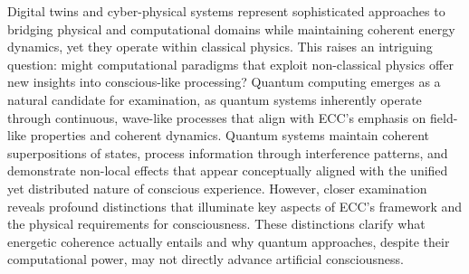 Digital twins and cyber-physical systems represent sophisticated approaches to bridging physical and computational domains while maintaining coherent energy dynamics, yet they operate within classical physics. This raises an intriguing question: might computational paradigms that exploit non-classical physics offer new insights into conscious-like processing? Quantum computing emerges as a natural candidate for examination, as quantum systems inherently operate through continuous, wave-like processes that align with ECC's emphasis on field-like properties and coherent dynamics. Quantum systems maintain coherent superpositions of states, process information through interference patterns, and demonstrate non-local effects that appear conceptually aligned with the unified yet distributed nature of conscious experience. However, closer examination reveals profound distinctions that illuminate key aspects of ECC's framework and the physical requirements for consciousness. These distinctions clarify what energetic coherence actually entails and why quantum approaches, despite their computational power, may not directly advance artificial consciousness.
